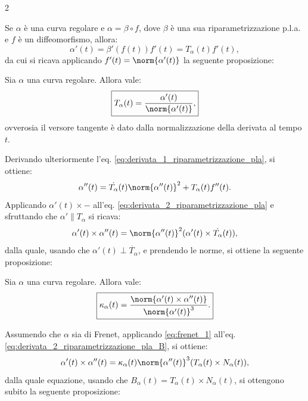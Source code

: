 \begin{multicols*}{2}
    \begin{remark}
        Se $\alpha$ è una curva regolare e $\alpha = \beta \circ f$, dove $\beta$ è una
        sua riparametrizzazione p.l.a. e $f$ è un diffeomorfismo, allora:
        \begin{equation} \label{eq:derivata_1_riparametrizzazione_pla}
            \alpha'(t) = \beta'(f(t)) f'(t) = T_\alpha(t) f'(t),
        \end{equation}
        da cui si ricava applicando $f'(t) = \norm{\alpha'(t)}$ la seguente proposizione:
    \end{remark}

    \begin{proposition}
        Sia $\alpha$ una curva regolare. Allora vale:
        \[
            \boxed{T_\alpha(t) = \frac{\alpha'(t)}{\norm{\alpha'(t)}},}
        \]
        ovverosia il versore tangente è dato dalla normalizzazione
        della derivata al tempo $t$.
    \end{proposition}

    \begin{remark}
        Derivando ulteriormente l'eq. \eqref{eq:derivata_1_riparametrizzazione_pla}, si ottiene:
        \begin{equation} \label{eq:derivata_2_riparametrizzazione_pla}
            \alpha''(t) = \dot{T_\alpha}(t) \norm{\alpha''(t)}^2 + T_\alpha(t) f''(t).
        \end{equation}
        Applicando $\alpha'(t) \times -$ all'eq. \eqref{eq:derivata_2_riparametrizzazione_pla} e
        sfruttando che $\alpha' \parallel T_\alpha$ si ricava:
        \begin{equation} \label{eq:derivata_2_riparametrizzazione_pla_B}
            \alpha'(t) \times \alpha''(t) = \norm{\alpha''(t)}^2 (\alpha'(t) \times \dot{T_\alpha}(t)),
        \end{equation}
        dalla quale, usando che $\alpha'(t) \perp \dot{T_\alpha}$, e prendendo le norme, si ottiene
        la seguente proposizione:
    \end{remark}

    \begin{proposition}
        Sia $\alpha$ una curva regolare. Allora vale:
        \[
            \boxed{\kappa_\alpha(t) = \frac{\norm{\alpha'(t) \times \alpha''(t)}}{\norm{\alpha'(t)}^3}.}
        \]
    \end{proposition}

    \begin{remark}
        Assumendo che $\alpha$ sia di Frenet, applicando \eqref{eq:frenet_1}
        all'eq. \eqref{eq:derivata_2_riparametrizzazione_pla_B}, si ottiene:
        \[
            \alpha'(t) \times \alpha''(t) = \kappa_\alpha(t) \norm{\alpha''(t)}^3 (T_\alpha(t) \times N_\alpha(t)),
        \]
        dalla quale equazione, usando che $B_\alpha(t) = T_\alpha(t) \times N_\alpha(t)$, si ottengono subito
        la seguente proposizione:
    \end{remark}


\end{multicols*}
